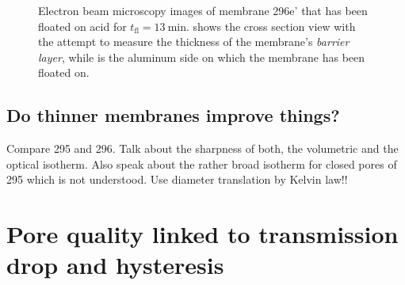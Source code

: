\documentclass[../thesis.tex]{subfiles}
\begin{document}
              \begin{figure}[htpb]
                \centering
                \hfill
                \caption{Electron beam microscopy images of membrane 296e' that has been floated on acid for $t_\mathrm{fl}=\SI{13}{\minute}$. \protect{} shows the cross section view with the attempt to measure the thickness of the membrane's \textit{barrier layer}, while \protect{} is the aluminum side on which the membrane has been floated on.}
                \label{fig:floatin-experiment}
              \end{figure}


        \subsection{Do thinner membranes improve things?}
        \label{sec:thinner-membranes}

          Compare 295 and 296. Talk about the sharpness of both, the volumetric and the optical isotherm. Also speak about the rather broad isotherm for closed pores of 295 which is not understood. Use diameter translation by Kelvin law!!


      \section{Pore quality linked to transmission drop and hysteresis}
      \label{sec:pore-quality-link}
\end{document}
